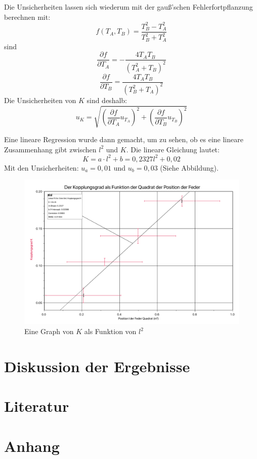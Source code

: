 \documentclass[11pt,a4paper]{article}
\begin{document}
Die Unsicherheiten lassen sich wiederum mit der gauß'schen Fehlerfortpflanzung berechnen mit:
$$f(T_A,T_B) = \frac{T_B^2-T_A^2}{T_B^2+T_A^2}$$
sind
$$\frac{\partial f}{\partial T_A} = -\frac{4T_A T_B}{(T_A^2+T_B)^2}$$
$$\frac{\partial f}{\partial T_B} = \frac{4T_A T_B}{(T_B^2+T_A)^2}$$
Die Unsicherheiten von $K$ sind deshalb:
$$u_{K} = \sqrt{(\frac{\partial f}{\partial T_A}u_{T_A})^2+(\frac{\partial f}{\partial T_B}u_{T_B})^2}$$

Eine lineare Regression wurde dann gemacht, um zu sehen, ob es eine lineare Zusammenhang gibt zwischen $l^2$ und $K$. Die lineare Gleichung lautet:
$$ K = a\cdot l^2 +b = 0,2327 l^2 + 0,02 $$
Mit den Unsicherheiten: $u_a = 0,01$ und $u_b = 0,03$ (Siehe Abbildung). 
\begin{figure}[h]
	\centering
	\includegraphics[width=\textwidth]{Abb2}
	\caption{Eine Graph von $K$ als Funktion von $l^2$}
\end{figure}

\section{Diskussion der Ergebnisse}

\section{Literatur}

\section{Anhang}
\end{document}

